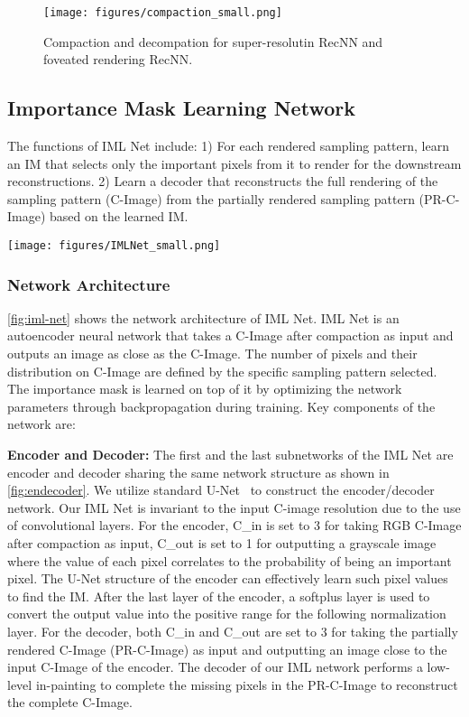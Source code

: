 \begin{figure}[t]
    \centering 
    \texttt{[image: figures/compaction\_small.png]}
    \caption{Compaction and decompation for super-resolutin RecNN and foveated rendering RecNN.}
    \label{fig:compaction}
\end{figure}

\subsection{Importance Mask Learning Network}
The functions of IML Net include: 1) For each rendered sampling pattern, learn an IM that selects only the important pixels from it to render for the downstream reconstructions. 2) Learn a decoder that reconstructs the full rendering of the sampling pattern (C-Image) from the partially rendered sampling pattern (PR-C-Image) based on the learned IM.

\begin{figure*}[t]
    \centering 
    \texttt{[image: figures/IMLNet\_small.png]}
    \caption{Network architecture of IML Net. IML Net works on a compact image (C-Image) domain which has a resolution of $n\times n$. The full-res output has a resolution of $m\times m$ where $m>n$.}
    \label{fig:iml-net}
\end{figure*}

\subsubsection{Network Architecture}
\cref{fig:iml-net} shows the network architecture of IML Net. IML Net is an autoencoder neural network that takes a C-Image after compaction as input and outputs an image as close as the C-Image. The number of pixels and their distribution on C-Image are defined by the specific sampling pattern selected. The importance mask is learned on top of it by optimizing the network parameters through backpropagation during training. Key components of the network are:

\textbf{Encoder and Decoder:}
The first and the last subnetworks of the IML Net are encoder and decoder sharing the same network structure as shown in \cref{fig:endecoder}. We utilize standard U-Net~\cite{10.1007/978-3-319-24574-4_28} to construct the encoder/decoder network. Our IML Net is invariant to the input C-image resolution due to the use of convolutional layers. For the encoder, C\_in is set to 3 for taking RGB C-Image after compaction as input, C\_out is set to 1 for outputting a grayscale image where the value of each pixel correlates to the probability of being an important pixel. The U-Net structure of the encoder can effectively learn such pixel values to find the IM. After the last layer of the encoder, a softplus layer is used to convert the output value into the positive range for the following normalization layer. For the decoder, both C\_in and C\_out are set to 3 for taking the partially rendered C-Image (PR-C-Image) as input and outputting an image close to the input C-Image of the encoder. The decoder of our IML network performs a low-level in-painting to complete the missing pixels in the PR-C-Image to reconstruct the complete C-Image.

